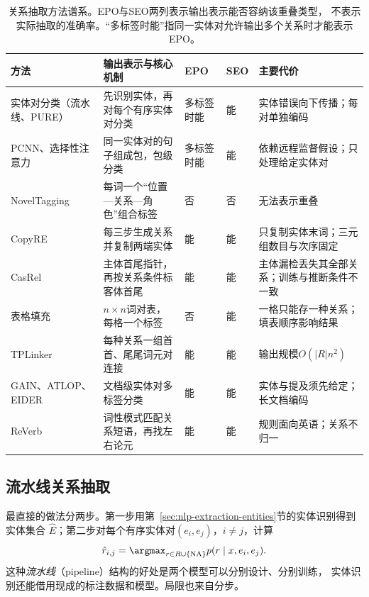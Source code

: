 \begin{table}[htbp]
  \centering
  \small
  \begin{tabularx}{\linewidth}{@{}>{\raggedright\arraybackslash}p{24mm}
    >{\raggedright\arraybackslash}X
    >{\centering\arraybackslash}p{16mm}>{\centering\arraybackslash}p{8mm}
    >{\raggedright\arraybackslash}X@{}}
    \toprule
    方法 & 输出表示与核心机制 & EPO & SEO & 主要代价 \\
    \midrule
    实体对分类（流水线、PURE） & 先识别实体，再对每个有序实体对分类 & 多标签时能 & 能 & 实体错误向下传播；每对单独编码 \\
    PCNN、选择性注意力 & 同一实体对的句子组成包，包级分类 & 多标签时能 & 能 & 依赖远程监督假设；只处理给定实体对 \\
    NovelTagging & 每词一个“位置—关系—角色”组合标签 & 否 & 否 & 无法表示重叠 \\
    CopyRE & 每三步生成关系并复制两端实体 & 能 & 能 & 只复制实体末词；三元组数目与次序固定 \\
    CasRel & 主体首尾指针，再按关系条件标客体首尾 & 能 & 能 & 主体漏检丢失其全部关系；训练与推断条件不一致 \\
    表格填充 & $n\times n$词对表，每格一个标签 & 否 & 能 & 一格只能存一种关系；填表顺序影响结果 \\
    TPLinker & 每种关系一组首首、尾尾词元对连接 & 能 & 能 & 输出规模$O(|R|n^2)$ \\
    GAIN、ATLOP、EIDER & 文档级实体对多标签分类 & 能 & 能 & 实体与提及须先给定；长文档编码 \\
    ReVerb & 词性模式匹配关系短语，再找左右论元 & 能 & 能 & 规则面向英语；关系不归一 \\
    \bottomrule
  \end{tabularx}
  \caption{关系抽取方法谱系。EPO与SEO两列表示输出表示能否容纳该重叠类型，
  不表示实际抽取的准确率。“多标签时能”指同一实体对允许输出多个关系时才能表示EPO。}
  \label{tab:nlp-extraction-relation-methods}
\end{table}

\subsection{流水线关系抽取}
\label{sec:nlp-extraction-relation-pipeline}

最直接的做法分两步。第一步用第~\ref{sec:nlp-extraction-entities}节的实体识别得到实体集合
$\widehat{E}$；第二步对每个有序实体对$(e_i,e_j)$，$i\neq j$，计算
\[
  \hat r_{i,j}=\argmax_{r\in R\cup\{\mathrm{NA}\}}p(r\mid x,e_i,e_j).
\]
这种\emph{流水线}（pipeline）结构的好处是两个模型可以分别设计、分别训练，
实体识别还能借用现成的标注数据和模型。局限也来自分步。

